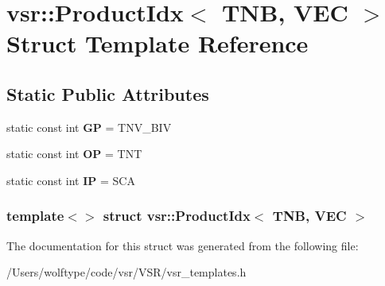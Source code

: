 \hypertarget{structvsr_1_1_product_idx_3_01_t_n_b_00_01_v_e_c_01_4}{\section{vsr\-:\-:Product\-Idx$<$ T\-N\-B, V\-E\-C $>$ Struct Template Reference}
\label{structvsr_1_1_product_idx_3_01_t_n_b_00_01_v_e_c_01_4}
}
\subsection*{Static Public Attributes}
\begin{DoxyCompactItemize}
\item 
\hypertarget{structvsr_1_1_product_idx_3_01_t_n_b_00_01_v_e_c_01_4_adefca6b9ce6d0697f5eca82da962e905}{static const int {\bfseries G\-P} = T\-N\-V\-\_\-\-B\-I\-V}\label{structvsr_1_1_product_idx_3_01_t_n_b_00_01_v_e_c_01_4_adefca6b9ce6d0697f5eca82da962e905}

\item 
\hypertarget{structvsr_1_1_product_idx_3_01_t_n_b_00_01_v_e_c_01_4_a3591514b322b3778c75d2ad855a97c02}{static const int {\bfseries O\-P} = T\-N\-T}\label{structvsr_1_1_product_idx_3_01_t_n_b_00_01_v_e_c_01_4_a3591514b322b3778c75d2ad855a97c02}

\item 
\hypertarget{structvsr_1_1_product_idx_3_01_t_n_b_00_01_v_e_c_01_4_ab49fb83c9601ae718e4f28449ec00c45}{static const int {\bfseries I\-P} = S\-C\-A}\label{structvsr_1_1_product_idx_3_01_t_n_b_00_01_v_e_c_01_4_ab49fb83c9601ae718e4f28449ec00c45}

\end{DoxyCompactItemize}
\subsubsection*{template$<$$>$ struct vsr\-::\-Product\-Idx$<$ T\-N\-B, V\-E\-C $>$}



The documentation for this struct was generated from the following file\-:\begin{DoxyCompactItemize}
\item 
/\-Users/wolftype/code/vsr/\-V\-S\-R/vsr\-\_\-templates.\-h\end{DoxyCompactItemize}
